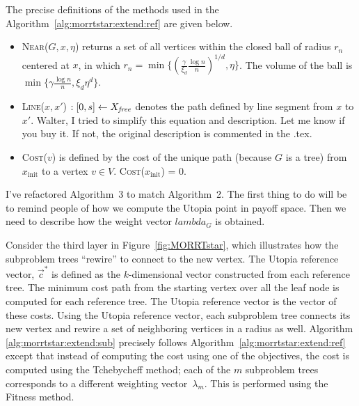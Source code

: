 \documentclass{article}
\begin{document}
The precise definitions of the methods used in the Algorithm~\ref{alg:morrtstar:extend:ref} are given below.
\begin{itemize}
	\item \textsc{Near}($ G, x, \eta $) returns a set of all vertices within the closed ball of radius $ r_{n} $ centered at $ x $, in which $ r_{n} = \min \{ ( \frac{\gamma}{\xi_{d}} \frac{\log n}{n} )^{1/d}  , \eta \} $.
	The volume of the ball is $ \min \{ \gamma \frac{\log n}{n} , \xi_{d} \eta^{d} \} $.

	\item \textsc{Line}($ x, x' $) $ : [0, s] \leftarrow X_{\it free} $ denotes the path defined by line segment from $x$ to $x'$.
	{\sc Walter, I tried to simplify this equation and description.  Let me know if you buy it.  If not, the original description is commented in the .tex.}
	
	\item \textsc{Cost}($ v  $) is defined by the cost of the unique path (because $G$ is a tree) from $ x_{ \mbox{init} } $ to a vertex $ v \in V $. \textsc{Cost}($ x_{ \mbox{init} } $) = $ 0 $.
\end{itemize}

{\sc I've refactored Algorithm~3 to match Algorithm~2. The first thing to do will be to remind people of how we compute the Utopia point in payoff space.  Then we need to describe how the weight vector $lambda_G$ is obtained.}

Consider the third layer in Figure~\ref{fig:MORRTstar}, which illustrates how the subproblem trees ``rewire'' to connect to the new vertex.  
The Utopia reference vector, $\vec{c}^*$ is defined as the $k$-dimensional vector constructed from each reference tree.  
The minimum cost path from the starting vertex over all the leaf node is  computed for each reference tree.  
The Utopia reference vector is the vector of these costs. 
Using the Utopia reference vector, each subproblem tree connects its new vertex and rewire a set of neighboring vertices in a radius as well. 
Algorithm \ref{alg:morrtstar:extend:sub} precisely follows Algorithm~\ref{alg:morrtstar:extend:ref} except that instead of computing the cost using one of the objectives, the cost is computed using the Tchebycheff method; each of the $m$ subproblem trees corresponds to a different weighting vector~$\lambda_m$.  
This is performed using the {\sc Fitness} method.
\end{document}
